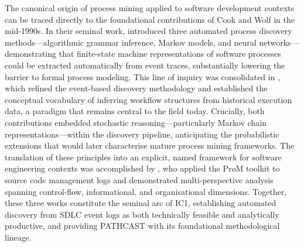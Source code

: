 

The canonical origin of process mining applied to software development contexts can be traced directly to the foundational contributions of Cook and Wolf in the mid-1990s. In their seminal work, \cite{cook1995} introduced three automated process discovery methods---algorithmic grammar inference, Markov models, and neural networks---demonstrating that finite-state machine representations of software processes could be extracted automatically from event traces, substantially lowering the barrier to formal process modeling. This line of inquiry was consolidated in \cite{cook1998}, which refined the event-based discovery methodology and established the conceptual vocabulary of inferring workflow structures from historical execution data, a paradigm that remains central to the field today. Crucially, both contributions embedded stochastic reasoning---particularly Markov chain representations---within the discovery pipeline, anticipating the probabilistic extensions that would later characterise mature process mining frameworks. The translation of these principles into an explicit, named framework for software engineering contexts was accomplished by \cite{rubin2007}, who applied the ProM toolkit to source code management logs and demonstrated multi-perspective analysis spanning control-flow, informational, and organisational dimensions. Together, these three works constitute the seminal arc of IC1, establishing automated discovery from SDLC event logs as both technically feasible and analytically productive, and providing PATHCAST with its foundational methodological lineage.




